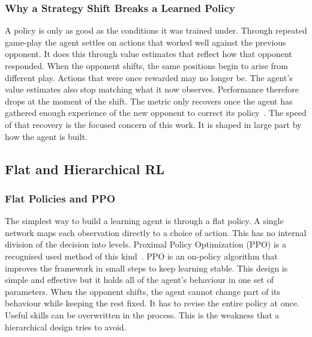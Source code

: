 \documentclass[sigconf,nonacm]{acmart}
\begin{document}
\subsubsection{Why a Strategy Shift Breaks a Learned Policy}
A policy is only as good as the conditions it was trained under. Through repeated
game-play the agent settles on actions that worked well against the previous opponent. It does this through value estimates that reflect how that opponent responded. When the
opponent shifts, the same positions begin to arise from different play. Actions
that were once rewarded may no longer be. The agent's value estimates also stop
matching what it now observes. Performance therefore drops at the moment of the
shift. The metric only recovers once the agent has gathered enough
experience of the new opponent to correct its policy~\cite{he2016opponent}. The speed of that recovery is the focused concern of this work. It is shaped in large part by how the agent
is built.

\subsection{Flat and Hierarchical RL}
\subsubsection{Flat Policies and PPO}
The simplest way to build a learning agent is through a flat policy. A single network
maps each observation directly to a choice of action. This has no internal division
of the decision into levels. Proximal Policy Optimization (PPO) is a recognised used
method of this kind~\cite{schulman2015trust}. PPO is an on-policy algorithm that
improves the framework in small steps to keep learning stable. This design is simple
and effective but it holds all of the agent's behaviour in one set of
parameters. When the opponent shifts, the agent cannot change part of its
behaviour while keeping the rest fixed. It has to revise the entire policy at once.
Useful skills can be overwritten in the process. This is the weakness that a
hierarchical design tries to avoid.

\end{document}
